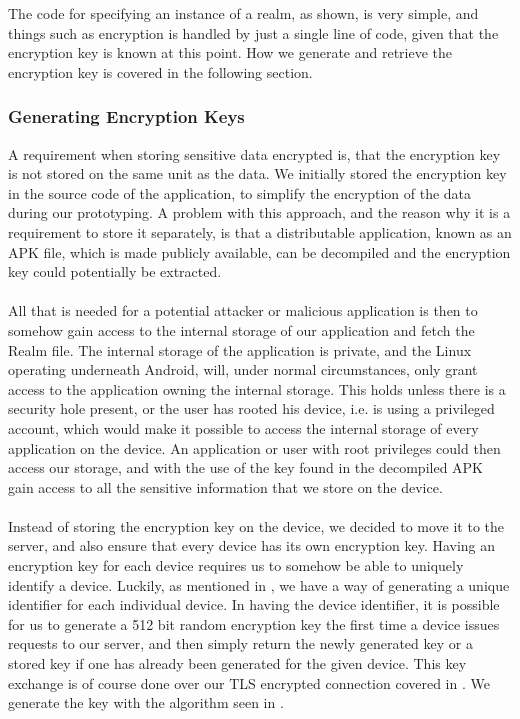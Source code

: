 
\FloatBarrier

The code for specifying an instance of a realm, as shown, is very simple, and things such as encryption is handled by just a single line of code, given that the encryption key is known at this point. How we generate and retrieve the encryption key is covered in the following section.

\subsubsection{Generating Encryption Keys}
\label{sub:encryption_keys}
A requirement when storing sensitive data encrypted is, that the encryption key is not stored on the same unit as the data. We initially stored the encryption key in the source code of the application, to simplify the encryption of the data during our prototyping. A problem with this approach, and the reason why it is a requirement to store it separately, is that a distributable application, known as an APK file, which is made publicly available, can be decompiled and the encryption key could potentially be extracted. 
\\\\
All that is needed for a potential attacker or malicious application is then to somehow gain access to the internal storage of our application and fetch the Realm file. The internal storage of the application is private, and the  Linux operating underneath Android, will, under normal circumstances, only grant access to the application owning the internal storage. This holds unless there is a security hole present, or the user has rooted his device, i.e. is using a privileged account, which would make it possible to access the internal storage of every application on the device. An application or user with root privileges could then access our storage, and with the use of the key found in the decompiled APK gain access to all the sensitive information that we store on the device.
\\\\
Instead of storing the encryption key on the device, we decided to move it to the server, and also ensure that every device has its own encryption key. Having an encryption key for each device requires us to somehow be able to uniquely identify a device. Luckily, as mentioned in , we have a way of generating a unique identifier for each individual device. In having the device identifier, it is possible for us to generate a 512 bit random encryption key the first time a device issues requests to our server, and then simply return the newly generated key or a stored key if one has already been generated for the given device. This key exchange is of course done over our TLS encrypted connection covered in . We generate the key with the algorithm seen in . 

